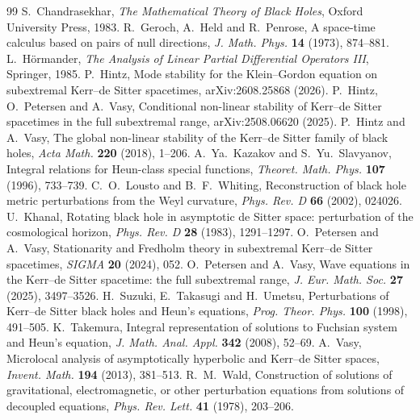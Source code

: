 \documentclass[11pt]{amsart}
\theoremstyle{definition}
\theoremstyle{remark}
\numberwithin{equation}{section}
\begin{document}
\begin{thebibliography}{99}
 S.~Chandrasekhar, \emph{The Mathematical Theory of Black Holes}, Oxford University Press, 1983.
 R.~Geroch, A.~Held and R.~Penrose, A space-time calculus based on pairs of null directions,
\emph{J. Math. Phys.} \textbf{14} (1973), 874--881.
 L.~H\"ormander, \emph{The Analysis of Linear Partial Differential Operators III}, Springer, 1985.
 P.~Hintz, Mode stability for the Klein--Gordon equation on subextremal Kerr--de Sitter spacetimes,
arXiv:2608.25868 (2026).
 P.~Hintz, O.~Petersen and A.~Vasy, Conditional non-linear stability of Kerr--de Sitter spacetimes in
the full subextremal range, arXiv:2508.06620 (2025).
 P.~Hintz and A.~Vasy, The global non-linear stability of the Kerr--de Sitter family of black holes,
\emph{Acta Math.} \textbf{220} (2018), 1--206.
 A.~Ya.~Kazakov and S.~Yu.~Slavyanov, Integral relations for Heun-class special functions,
\emph{Theoret. Math. Phys.} \textbf{107} (1996), 733--739.
 C.~O.~Lousto and B.~F.~Whiting, Reconstruction of black hole metric perturbations from the Weyl
curvature, \emph{Phys. Rev. D} \textbf{66} (2002), 024026.
 U.~Khanal, Rotating black hole in asymptotic de Sitter space: perturbation of the cosmological
horizon, \emph{Phys. Rev. D} \textbf{28} (1983), 1291--1297.
 O.~Petersen and A.~Vasy, Stationarity and Fredholm theory in subextremal Kerr--de Sitter spacetimes,
\emph{SIGMA} \textbf{20} (2024), 052.
 O.~Petersen and A.~Vasy, Wave equations in the Kerr--de Sitter spacetime: the full subextremal range,
\emph{J. Eur. Math. Soc.} \textbf{27} (2025), 3497--3526.
 H.~Suzuki, E.~Takasugi and H.~Umetsu, Perturbations of Kerr--de Sitter black holes and Heun's
equations, \emph{Prog. Theor. Phys.} \textbf{100} (1998), 491--505.
 K.~Takemura, Integral representation of solutions to Fuchsian system and Heun's equation,
\emph{J. Math. Anal. Appl.} \textbf{342} (2008), 52--69.
 A.~Vasy, Microlocal analysis of asymptotically hyperbolic and Kerr--de Sitter spaces,
\emph{Invent. Math.} \textbf{194} (2013), 381--513.
 R.~M.~Wald, Construction of solutions of gravitational, electromagnetic, or other perturbation
equations from solutions of decoupled equations, \emph{Phys. Rev. Lett.} \textbf{41} (1978), 203--206.
\end{thebibliography}
\end{document}
